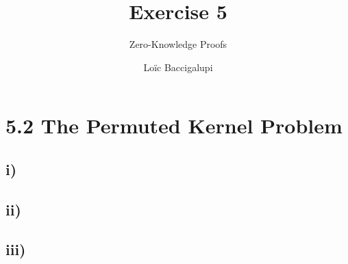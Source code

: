 \documentclass{scrartcl}
\title{Exercise 5}
\subtitle{Zero-Knowledge Proofs}
\author{Loïc Baccigalupi}
\begin{document}
\maketitle

\section*{5.2 The Permuted Kernel Problem}

\subsection*{i)}


\subsection*{ii)}


\subsection*{iii)}
\end{document}
